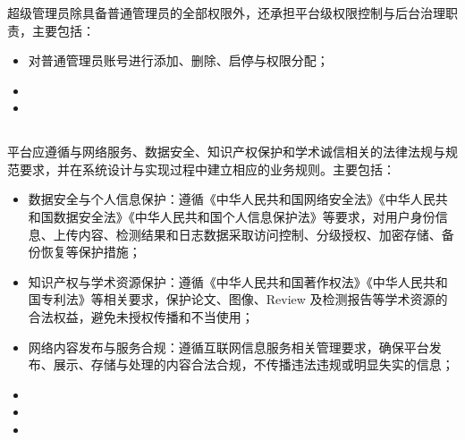 \subsubsection{}

超级管理员除具备普通管理员的全部权限外，还承担平台级权限控制与后台治理职责，主要包括：

\begin{itemize}
    \item 对普通管理员账号进行添加、删除、启停与权限分配；
    \item {}
    \item {}
\end{itemize}

\subsection{}

平台应遵循与网络服务、数据安全、知识产权保护和学术诚信相关的法律法规与规范要求，并在系统设计与实现过程中建立相应的业务规则。主要包括：

\begin{itemize}
    \item 数据安全与个人信息保护：遵循《中华人民共和国网络安全法》《中华人民共和国数据安全法》《中华人民共和国个人信息保护法》等要求，对用户身份信息、上传内容、检测结果和日志数据采取访问控制、分级授权、加密存储、备份恢复等保护措施；
    \item 知识产权与学术资源保护：遵循《中华人民共和国著作权法》《中华人民共和国专利法》等相关要求，保护论文、图像、Review 及检测报告等学术资源的合法权益，避免未授权传播和不当使用；
    \item 网络内容发布与服务合规：遵循互联网信息服务相关管理要求，确保平台发布、展示、存储与处理的内容合法合规，不传播违法违规或明显失实的信息；
    \item {}
    \item {}
    \item {}
\end{itemize}

